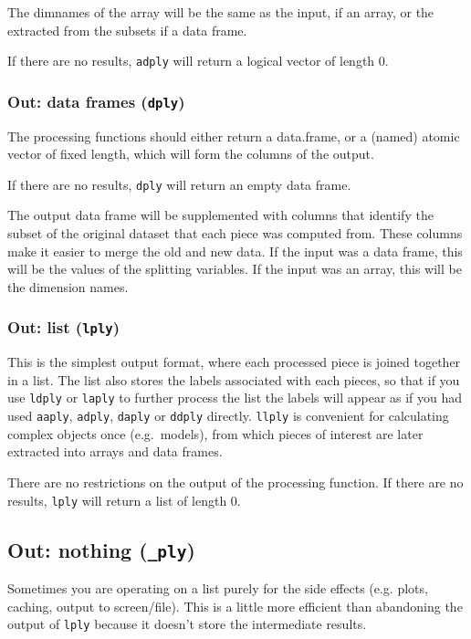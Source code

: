 \documentclass[letterpaper,oneside]{scrartcl}
\begin{document}
The dimnames of the array will be the same as the input, if an array, or the extracted from the subsets if a data frame.

If there are no results, {\tt adply} will return a logical vector of length 0.

\subsubsection{Out: data frames ({\tt *dply})}

The processing functions should either return a data.frame, or a (named) atomic vector of fixed length, which will form the columns of the output.

If there are no results, {\tt *dply} will return an empty data frame.

The output data frame will be supplemented with columns that identify the subset of the original dataset that each piece was computed from.  These columns make it easier to merge the old and new data.  If the input was a data frame, this will be the values of the splitting variables.  If the input was an array, this will be the dimension names.

\subsubsection{Out: list ({\tt *lply})}

This is the simplest output format, where each processed piece is joined together in a list.  The list also stores the labels associated with each pieces, so that if you use {\tt ldply} or {\tt laply} to further process the list the labels will appear as if you had used {\tt aaply}, {\tt adply}, {\tt daply} or {\tt ddply} directly.  {\tt llply} is convenient for calculating complex objects once (e.g.\ models), from which pieces of interest are later extracted into arrays and data frames.

There are no restrictions on the output of the processing function.  If there are no results, {\tt *lply} will return a list of length 0.

\subsection{Out: nothing ({\tt *\_ply})}

Sometimes you are operating on a list purely for the side effects (e.g. plots, caching, output to screen/file).  This is a little more efficient than abandoning the output of {\tt *lply} because it doesn't store the intermediate results.
\end{document}
